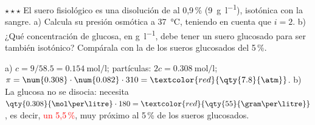 \begin{exercise}
    \(\star\star\star\) El suero fisiológico es una disolución de  al 0,9\,\% (\qty{9}{\gram\per\litre}), isotónica con la
    sangre. a) Calcula su presión osmótica a \qty{37}{\degreeCelsius}, teniendo en cuenta que \(i = 2\). b) ¿Qué concentración de
    glucosa, en \unit{\gram\per\litre}, debe tener un suero glucosado para ser también isotónico? Compárala con la de los sueros
    glucosados del 5\,\%.
    \begin{solu}
        a) \(c = 9/\num{58.5} = \qty{0.154}{\mol\per\litre}\); partículas: \(2c = \qty{0.308}{\mol\per\litre}\);
        \(\pi = \num{0.308} \cdot \num{0.082} \cdot 310 = \textcolor{red}{\qty{7.8}{\atm}}\). b) La glucosa no se disocia: necesita
        \(\qty{0.308}{\mol\per\litre} \cdot 180 = \textcolor{red}{\qty{55}{\gram\per\litre}}\), es decir, \textcolor{red}{un 5,5\,\%},
        muy próximo al 5\,\% de los sueros glucosados.
    \end{solu}
\end{exercise}
